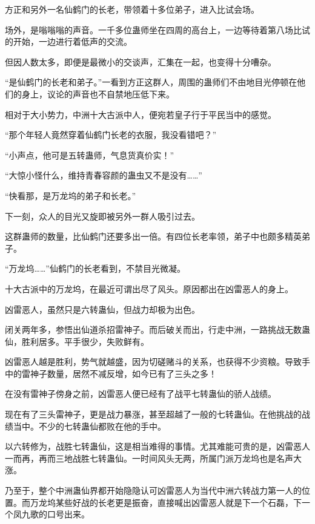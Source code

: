 
\begin{this_body}



方正和另外一名仙鹤门的长老，带领着十多位弟子，进入比试会场。

场外，是嗡嗡嗡的声音。一千多位蛊师坐在四周的高台上，一边等待着第八场比试的开始，一边进行着低声的交流。

但因人数太多，即便是最微小的交谈声，汇集在一起，也变得十分嘈杂。

“是仙鹤门的长老和弟子。”一看到方正这群人，周围的蛊师们不由地目光停顿在他们的身上，议论的声音也不自禁地压低下来。

相对于大小势力，中洲十大古派中人，便宛若皇子行于平民当中的感觉。

“那个年轻人竟然穿着仙鹤门长老的衣服，我没看错吧？”

“小声点，他可是五转蛊师，气息货真价实！”

“大惊小怪什么，维持青春容颜的蛊虫又不是没有……”

“快看那，是万龙坞的弟子和长老。”

下一刻，众人的目光又旋即被另外一群人吸引过去。

这群蛊师的数量，比仙鹤门还要多出一倍。有四位长老率领，弟子中也颇多精英弟子。

“万龙坞……”仙鹤门的长老看到，不禁目光微凝。

十大古派中的万龙坞，在最近可谓出尽了风头。原因都出在凶雷恶人的身上。

凶雷恶人，虽然只是六转蛊仙，但战力却极为出色。

闭关两年多，参悟出仙道杀招雷神子。而后破关而出，行走中洲，一路挑战无数蛊仙，胜利居多。平手很少，失败鲜有。

凶雷恶人越是胜利，势气就越盛，因为切磋赌斗的关系，也获得不少资粮。导致手中的雷神子数量，居然不减反增，如今已有了三头之多！

在没有雷神子傍身之前，凶雷恶人便已经有了战平七转蛊仙的骄人战绩。

现在有了三头雷神子，更是战力暴涨，甚至超越了一般的七转蛊仙。在他挑战的战绩当中。不少的七转蛊仙都败在他的手中。

以六转修为，战胜七转蛊仙，这是相当难得的事情。尤其难能可贵的是，凶雷恶人一而再，再而三地战胜七转蛊仙。一时间风头无两，所属门派万龙坞也是名声大涨。

乃至于，整个中洲蛊仙界都开始隐隐认可凶雷恶人为当代中洲六转战力第一人的位置。而万龙坞某些好战的长老更是振奋，直接喊出凶雷恶人就是下一个石磊，下一个凤九歌的口号出来。


\end{this_body}
